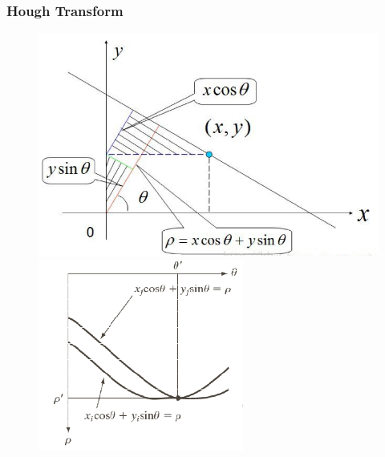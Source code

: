 \documentclass[notheorems,serif,table,compress]{beamer}  %
\begin{document}
\begin{frame}
\frametitle{Hough Transform}
    \begin{figure}
        \begin{minipage}[t]{0.4\linewidth}
            \includegraphics[width=1.5\linewidth]{hough1.png} 
        \end{minipage}
        \qquad 
        \qquad
        \quad
        \begin{minipage}[t]{0.4\linewidth}
            \includegraphics[width=1.05\linewidth]{hough3.png} 
        \end{minipage}
    \end{figure}

\end{frame}
\end{document}
